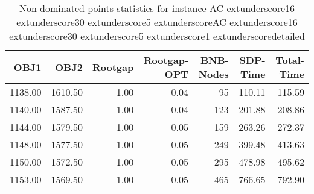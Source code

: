 \begin{table}
\caption{Non-dominated points statistics for instance AC	extunderscore16	extunderscore30	extunderscore5	extunderscoreAC	extunderscore16	extunderscore30	extunderscore5	extunderscore1	extunderscoredetailed}
\label{tab:stats/AC_16_30_5_AC_16_30_5_1_detailed}
\begin{tabular}{rrrrrrr}
\toprule
OBJ1 & OBJ2 & Rootgap & Rootgap-OPT & BNB-Nodes & SDP-Time & Total-Time \\
\midrule
1138.00 & 1610.50 & 1.00 & 0.04 & 95 & 110.11 & 115.59 \\
1140.00 & 1587.50 & 1.00 & 0.04 & 123 & 201.88 & 208.86 \\
1144.00 & 1579.50 & 1.00 & 0.05 & 159 & 263.26 & 272.37 \\
1148.00 & 1577.50 & 1.00 & 0.05 & 249 & 399.48 & 413.63 \\
1150.00 & 1572.50 & 1.00 & 0.05 & 295 & 478.98 & 495.62 \\
1153.00 & 1569.50 & 1.00 & 0.05 & 465 & 766.65 & 792.90 \\
\bottomrule
\end{tabular}
\end{table}
